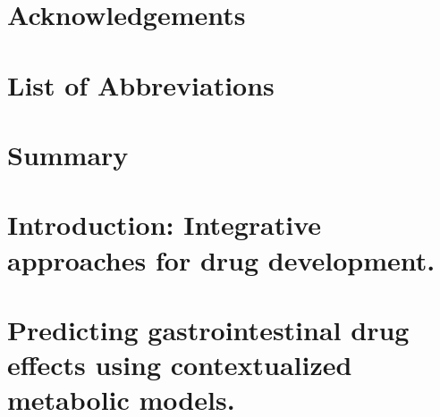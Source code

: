 \documentclass[12pt,a4paper]{book}
\begin{document}




\clearpage

\clearpage

\clearpage
\chapter*{Acknowledgements}

\tableofcontents

\listoffigures%
\listoftables%

\cleardoublepage
{}
{}
\chapter*{List of Abbreviations}


\cleardoublepage
{}
{}
\chapter*{Summary}




\chapter{Introduction: Integrative approaches for drug development.}
\label{ch:chapter1}

\chapter{Predicting gastrointestinal drug effects using contextualized metabolic models.}
\label{ch:chapter2}
\end{document}
